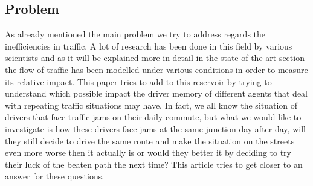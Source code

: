 \documentclass[a4paper,hidelinks]{article}
\begin{document}
\subsection{Problem}
As already mentioned the main problem we try to address regards the inefficiencies in traffic. A lot of research has been done in this field by various scientists and as it will be explained more in detail in the state of the art section the flow of traffic has been modelled under various conditions in order to measure its relative impact. This paper tries to add to this reservoir by trying to understand which possible impact the driver memory of different agents that deal with repeating traffic situations may have. In fact, we all know the situation of drivers that face traffic jams on their daily commute, but what we would like to investigate is how these drivers face jams at the same junction day after day, will they still decide to drive the same route and make the situation on the streets even more worse then it actually is or would they better it by deciding to try their luck of the beaten path the next time? This article tries to get closer to an answer for these questions. 
\end{document}
